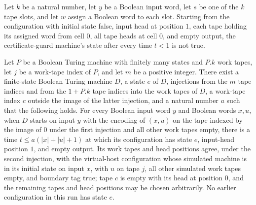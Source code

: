 \begin{theorem}
\label{Turing.certGuard_cut}
\leanok
{}
Let $k$ be a natural number, let $y$ be a Boolean input word, let $s$ be one of the $k$
tape slots, and let $w$ assign a Boolean word to each slot. Starting from the
configuration with initial state false, input head at position $1$, each tape holding
its assigned word from cell $0$, all tape heads at cell $0$, and empty output, the
certificate-guard machine's state after every time $t<1$ is not true.
\end{theorem}

\begin{theorem}
\label{Turing.cert_prepare_exists}
\leanok
{}
Let $P$ be a Boolean Turing machine with finitely many states and $P.k$ work tapes, let
$j$ be a work-tape index of $P$, and let $m$ be a positive integer. There exist a
finite-state Boolean Turing machine $D$, a state $e$ of $D$, injections from the $m$
tape indices and from the $1+P.k$ tape indices into the work tapes of $D$, a work-tape
index $c$ outside the image of the latter injection, and a natural number $a$ such that
the following holds. For every Boolean input word $y$ and Boolean words $x,u$, when $D$
starts on input $y$ with the encoding of $(x,u)$ on the tape indexed by the image of $0$
under the first injection and all other work tapes empty, there is a time $t\le
a(|x|+|u|+1)$ at which its configuration has state $e$, input-head position $1$, and
empty output. Its work tapes and head positions agree, under the second injection, with
the virtual-host configuration whose simulated machine is in its initial state on input
$x$, with $u$ on tape $j$, all other simulated work tapes empty, and boundary tag true;
tape $c$ is empty with its head at position $0$, and the remaining tapes and head
positions may be chosen arbitrarily. No earlier configuration in this run has state $e$.
\end{theorem}


